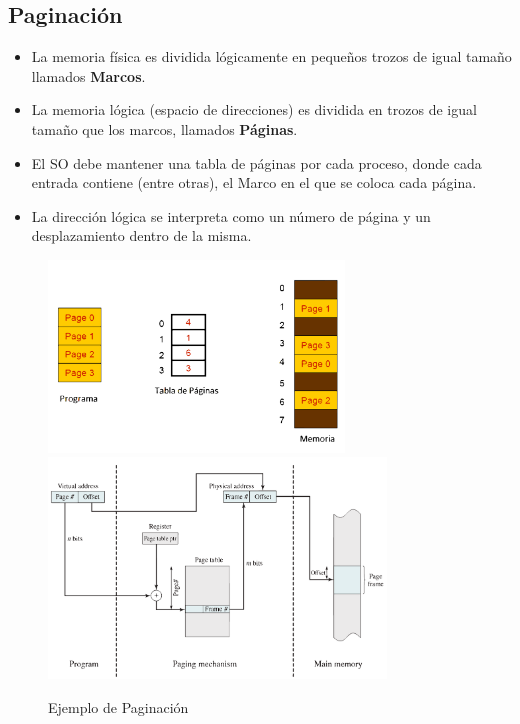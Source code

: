 \subsection{Paginación}
\begin{itemize}
    \item La memoria física es dividida lógicamente en pequeños trozos de igual tamaño llamados \textbf{Marcos}.
    \item La memoria lógica (espacio de direcciones) es dividida en trozos de igual tamaño que los marcos, llamados \textbf{Páginas}.
    \item El SO debe mantener una tabla de páginas por cada proceso, donde cada entrada contiene (entre otras), el Marco en el que se coloca cada página.
    \item La dirección lógica se interpreta como un número de página y un desplazamiento dentro de la misma.
\end{itemize}
\begin{figure}[h]
    \begin{center}
        \includegraphics[width=0.70\textwidth]{assets/Paging.pdf}
        \includegraphics[width=0.80\textwidth]{assets/PagingTraslation.pdf}
    \end{center}
    \caption{Ejemplo de Paginación}\label{fig:}
\end{figure}
\pagebreak

